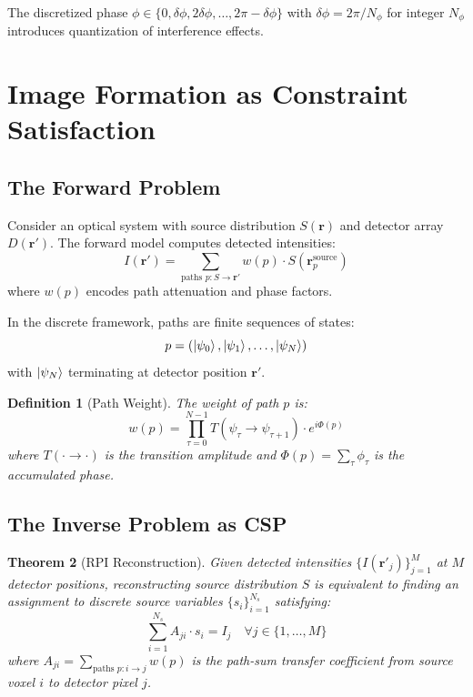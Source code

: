 \documentclass[twocolumn,10pt,a4paper]{article}
\newtheorem{theorem}{Theorem}[section]
\newtheorem{definition}[theorem]{Definition}
\begin{document}
The discretized phase $\phi \in \{0, \delta\phi, 2\delta\phi, \ldots, 2\pi - \delta\phi\}$ with $\delta\phi = 2\pi/N_\phi$ for integer $N_\phi$ introduces quantization of interference effects.

\section{Image Formation as Constraint Satisfaction}

\subsection{The Forward Problem}

Consider an optical system with source distribution $S(\mathbf{r})$ and detector array $D(\mathbf{r}')$. The forward model computes detected intensities:
\begin{equation}
I(\mathbf{r}') = \sum_{\text{paths } p: S \to \mathbf{r}'} w(p) \cdot S(\mathbf{r}_p^{\text{source}})
\end{equation}
where $w(p)$ encodes path attenuation and phase factors.

In the discrete framework, paths are finite sequences of states:
\begin{equation}
p = (\ket{\psi_0}, \ket{\psi_1}, \ldots, \ket{\psi_N})
\end{equation}
with $\ket{\psi_N}$ terminating at detector position $\mathbf{r}'$.

\begin{definition}[Path Weight]
The weight of path $p$ is:
\begin{equation}
w(p) = \prod_{\tau=0}^{N-1} T(\psi_\tau \to \psi_{\tau+1}) \cdot e^{i\Phi(p)}
\end{equation}
where $T(\cdot \to \cdot)$ is the transition amplitude and $\Phi(p) = \sum_\tau \phi_\tau$ is the accumulated phase.
\end{definition}

\subsection{The Inverse Problem as CSP}

\begin{theorem}[RPI Reconstruction]
Given detected intensities $\{I(\mathbf{r}'_j)\}_{j=1}^M$ at $M$ detector positions, reconstructing source distribution $S$ is equivalent to finding an assignment to discrete source variables $\{s_i\}_{i=1}^{N_s}$ satisfying:
\begin{equation}
\sum_{i=1}^{N_s} A_{ji} \cdot s_i = I_j \quad \forall j \in \{1, \ldots, M\}
\end{equation}
where $A_{ji} = \sum_{\text{paths } p: i \to j} w(p)$ is the path-sum transfer coefficient from source voxel $i$ to detector pixel $j$.
\end{theorem}
\end{document}
